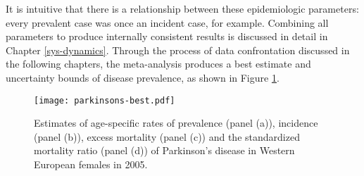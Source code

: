 It is intuitive that there is a relationship between these
epidemiologic parameters: every prevalent case was once an incident
case, for example.  Combining all parameters to produce internally
consistent results is discussed in detail in Chapter
\ref{sys-dynamics}.  Through the process of data confrontation
discussed in the following chapters, the meta-analysis produces a best
estimate and uncertainty bounds of disease prevalence, as shown in
Figure \ref{fig:intro-parkinsons fit}.

    \begin{figure}[h]
        \begin{center}
            \texttt{[image: parkinsons-best.pdf]}
            \caption{Estimates of age-specific rates of
              prevalence (panel (a)), incidence (panel (b)),
              excess mortality (panel (c)) and the
              standardized mortality ratio (panel (d)) of Parkinson's
              disease in Western European females in 2005.}
            \label{fig:intro-parkinsons fit}
        \end{center}
    \end{figure}
